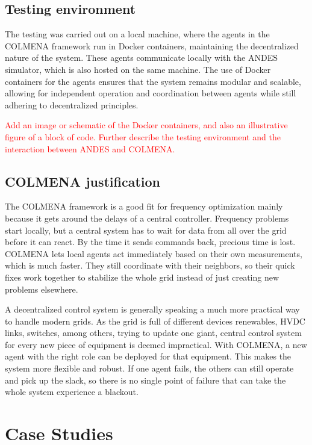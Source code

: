 \documentclass{article}
\begin{document}
\subsection{Testing environment}

The testing was carried out on a local machine, where the agents in the COLMENA framework run in Docker containers, maintaining the decentralized nature of the system. These agents communicate locally with the ANDES simulator, which is also hosted on the same machine. The use of Docker containers for the agents ensures that the system remains modular and scalable, allowing for independent operation and coordination between agents while still adhering to decentralized principles. 

\textcolor{red}{Add an image or schematic of the Docker containers, and also an illustrative figure of a block of code. Further describe the testing environment and the interaction between ANDES and COLMENA.}

\subsection{COLMENA justification}
The COLMENA framework is a good fit for frequency optimization mainly because it gets around the delays of a central controller. Frequency problems start locally, but a central system has to wait for data from all over the grid before it can react. By the time it sends commands back, precious time is lost. COLMENA lets local agents act immediately based on their own measurements, which is much faster. They still coordinate with their neighbors, so their quick fixes work together to stabilize the whole grid instead of just creating new problems elsewhere.

A decentralized control system is generally speaking a much more practical way to handle modern grids. As the grid is full of different devices renewables, HVDC links, switches, among others, trying to update one giant, central control system for every new piece of equipment is deemed impractical. With COLMENA, a new agent with the right role can be deployed for that equipment. This makes the system more flexible and robust. If one agent fails, the others can still operate and pick up the slack, so there is no single point of failure that can take the whole system experience a blackout. 

\newpage
\section{Case Studies}
\end{document}
